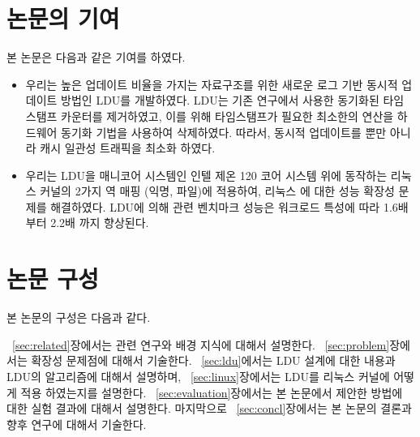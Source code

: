 \newpage
\section{논문의 기여}\label{sec:introcontri}
본 논문은 다음과 같은 기여를 하였다.
\begin{itemize}
\item 우리는 높은 업데이트 비율을 가지는 자료구조를 위한 새로운 로그 기반 동시적 업데이트
 방법인 LDU를 개발하였다.
LDU는 기존 연구에서 사용한 동기화된 타임 스탬프 카운터를 제거하였고, 이를 위해 
타임스탬프가 필요한 최소한의 연산을 하드웨어 동기화 기법을 사용하여 삭제하였다.
따라서, 동시적 업데이트를 뿐만 아니라 캐시 일관성 트래픽을 최소화 하였다.
\item 
우리는 LDU을 매니코어 시스템인 인텔 제온 120 코어 시스템 위에 동작하는 리눅스 커널의 
2가지 역 매핑 (익명, 파일)에 적용하여, 리눅스 에 대한 성능 확장성 문제를 해결하였다.
LDU에 의해  관련 벤치마크 성능은 워크로드 특성에 따라 1.6배 부터 2.2배 까지 향상된다.
\end{itemize}


\newpage
\section{논문 구성} \label{sec:intro}
본 논문의 구성은 다음과 같다.

~\ref{sec:related}장에서는 관련 연구와 배경 지식에 대해서 설명한다.
~\ref{sec:problem}장에서는 확장성 문제점에 대해서 기술한다. 
~\ref{sec:ldu}에서는 LDU 설계에 대한 내용과 LDU의 알고리즘에 대해서 설명하며,
~\ref{sec:linux}장에서는 LDU를 리눅스 커널에 어떻게 적용 하였는지를 설명한다.
~\ref{sec:evaluation}장에서는 본 논문에서 제안한 방법에 대한 실험 결과에 대해서 설명한다. 
마지막으로 ~\ref{sec:concl}장에서는 본 논문의 결론과 향후 연구에 대해서 기술한다. 

